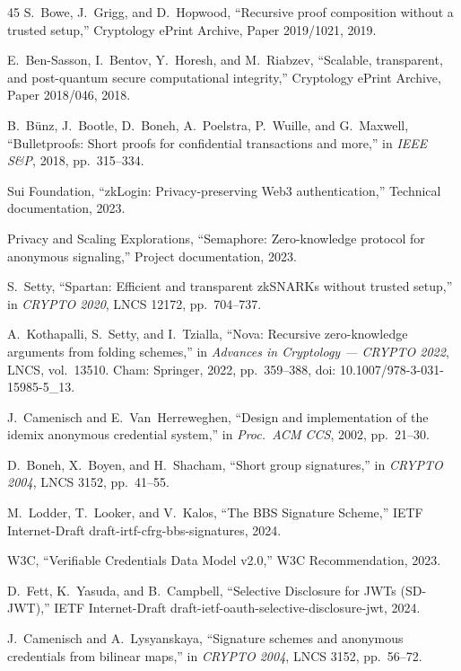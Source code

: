 \documentclass[journal,twoside,10pt]{IEEEtran}
\begin{document}
\begin{thebibliography}{45}
S.~Bowe, J.~Grigg, and D.~Hopwood, ``Recursive proof composition without a
trusted setup,'' Cryptology ePrint Archive, Paper 2019/1021, 2019.

E.~Ben-Sasson, I.~Bentov, Y.~Horesh, and M.~Riabzev, ``Scalable, transparent,
and post-quantum secure computational integrity,'' Cryptology ePrint
Archive, Paper 2018/046, 2018.

B.~B{\"u}nz, J.~Bootle, D.~Boneh, A.~Poelstra, P.~Wuille, and G.~Maxwell,
``Bulletproofs: Short proofs for confidential transactions and more,'' in
\emph{IEEE S\&P}, 2018, pp.~315--334.

Sui Foundation, ``zkLogin: Privacy-preserving Web3 authentication,''
Technical documentation, 2023.

Privacy and Scaling Explorations, ``Semaphore: Zero-knowledge protocol for
anonymous signaling,'' Project documentation, 2023.

S.~Setty, ``Spartan: Efficient and transparent zkSNARKs without trusted
setup,'' in \emph{CRYPTO 2020}, LNCS 12172, pp.~704--737.

A.~Kothapalli, S.~Setty, and I.~Tzialla, ``Nova: Recursive zero-knowledge
arguments from folding schemes,'' in \emph{Advances in Cryptology ---
CRYPTO 2022}, LNCS, vol.~13510. Cham: Springer, 2022, pp.~359--388,
doi: 10.1007/978-3-031-15985-5\_13.

J.~Camenisch and E.~Van~Herreweghen, ``Design and implementation of the
idemix anonymous credential system,'' in \emph{Proc.\ ACM CCS}, 2002,
pp.~21--30.

D.~Boneh, X.~Boyen, and H.~Shacham, ``Short group signatures,'' in
\emph{CRYPTO 2004}, LNCS 3152, pp.~41--55.

M.~Lodder, T.~Looker, and V.~Kalos, ``The BBS Signature Scheme,'' IETF
Internet-Draft draft-irtf-cfrg-bbs-signatures, 2024.

W3C, ``Verifiable Credentials Data Model v2.0,'' W3C Recommendation, 2023.

D.~Fett, K.~Yasuda, and B.~Campbell, ``Selective Disclosure for JWTs
(SD-JWT),'' IETF Internet-Draft draft-ietf-oauth-selective-disclosure-jwt,
2024.

J.~Camenisch and A.~Lysyanskaya, ``Signature schemes and anonymous
credentials from bilinear maps,'' in \emph{CRYPTO 2004}, LNCS 3152,
pp.~56--72.


\end{thebibliography}
\end{document}
